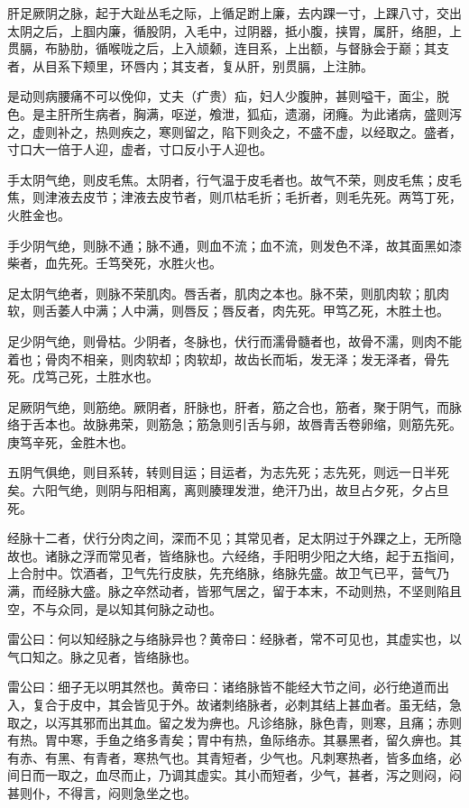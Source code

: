 \documentclass[a4paper,12pt,UTF8,twoside]{ctexbook}
\begin{document}
	肝足厥阴之脉，起于大趾丛毛之际，上循足跗上廉，去内踝一寸，上踝八寸，交出太阴之后，上腘内廉，循股阴，入毛中，过阴器，抵小腹，挟胃，属肝，络胆，上贯膈，布胁肋，循喉咙之后，上入颃颡，连目系，上出额，与督脉会于巅；其支者，从目系下颊里，环唇内；其支者，复从肝，别贯膈，上注肺。
	
	是动则病腰痛不可以俛仰，丈夫（疒贵）疝，妇人少腹肿，甚则嗌干，面尘，脱色。是主肝所生病者，胸满，呕逆，飧泄，狐疝，遗溺，闭癃。为此诸病，盛则泻之，虚则补之，热则疾之，寒则留之，陷下则灸之，不盛不虚，以经取之。盛者，寸口大一倍于人迎，虚者，寸口反小于人迎也。
	
	手太阴气绝，则皮毛焦。太阴者，行气温于皮毛者也。故气不荣，则皮毛焦；皮毛焦，则津液去皮节；津液去皮节者，则爪枯毛折；毛折者，则毛先死。两笃丁死，火胜金也。
	
	手少阴气绝，则脉不通；脉不通，则血不流；血不流，则发色不泽，故其面黑如漆柴者，血先死。壬笃癸死，水胜火也。
	
	足太阴气绝者，则脉不荣肌肉。唇舌者，肌肉之本也。脉不荣，则肌肉软；肌肉软，则舌萎人中满；人中满，则唇反；唇反者，肉先死。甲笃乙死，木胜土也。
	
	足少阴气绝，则骨枯。少阴者，冬脉也，伏行而濡骨髓者也，故骨不濡，则肉不能着也；骨肉不相亲，则肉软却；肉软却，故齿长而垢，发无泽；发无泽者，骨先死。戊笃己死，土胜水也。
	
	足厥阴气绝，则筋绝。厥阴者，肝脉也，肝者，筋之合也，筋者，聚于阴气，而脉络于舌本也。故脉弗荣，则筋急；筋急则引舌与卵，故唇青舌卷卵缩，则筋先死。庚笃辛死，金胜木也。
	
	五阴气俱绝，则目系转，转则目运；目运者，为志先死；志先死，则远一日半死矣。六阳气绝，则阴与阳相离，离则腠理发泄，绝汗乃出，故旦占夕死，夕占旦死。
	
	经脉十二者，伏行分肉之间，深而不见；其常见者，足太阴过于外踝之上，无所隐故也。诸脉之浮而常见者，皆络脉也。六经络，手阳明少阳之大络，起于五指间，上合肘中。饮酒者，卫气先行皮肤，先充络脉，络脉先盛。故卫气已平，营气乃满，而经脉大盛。脉之卒然动者，皆邪气居之，留于本末，不动则热，不坚则陷且空，不与众同，是以知其何脉之动也。
	
	雷公曰：何以知经脉之与络脉异也？黄帝曰：经脉者，常不可见也，其虚实也，以气口知之。脉之见者，皆络脉也。
	
	雷公曰：细子无以明其然也。黄帝曰：诸络脉皆不能经大节之间，必行绝道而出入，复合于皮中，其会皆见于外。故诸刺络脉者，必刺其结上甚血者。虽无结，急取之，以泻其邪而出其血。留之发为痹也。凡诊络脉，脉色青，则寒，且痛；赤则有热。胃中寒，手鱼之络多青矣；胃中有热，鱼际络赤。其暴黑者，留久痹也。其有赤、有黑、有青者，寒热气也。其青短者，少气也。凡刺寒热者，皆多血络，必间日而一取之，血尽而止，乃调其虚实。其小而短者，少气，甚者，泻之则闷，闷甚则仆，不得言，闷则急坐之也。
	
\end{document}
